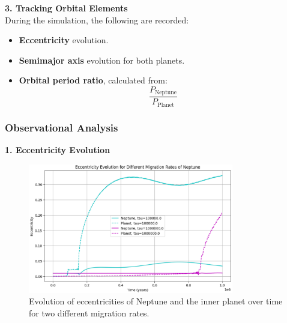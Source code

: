 \documentclass[12pt,a4paper]{article}
\begin{document}
\textbf{3. Tracking Orbital Elements}
\\ During the simulation, the following are recorded:
\begin{itemize}
    \item \textbf{Eccentricity} evolution.
    \item \textbf{Semimajor axis} evolution for both planets.
    \item \textbf{Orbital period ratio}, calculated from:
    \begin{equation}
        \frac{P_{\text{Neptune}}}{P_{\text{Planet}}}
    \end{equation}
\end{itemize}

\subsubsection{Observational Analysis}
\textbf{1. Eccentricity Evolution}
\begin{figure}[h]
  \centering
  \includegraphics[width=0.8\textwidth]{ExpoMig/Eccentricity_Evo.png}
  \caption{Evolution of eccentricities of Neptune and the inner planet over time for two different migration rates.}
  \label{fig:eccentricity}
\end{figure}
\end{document}
